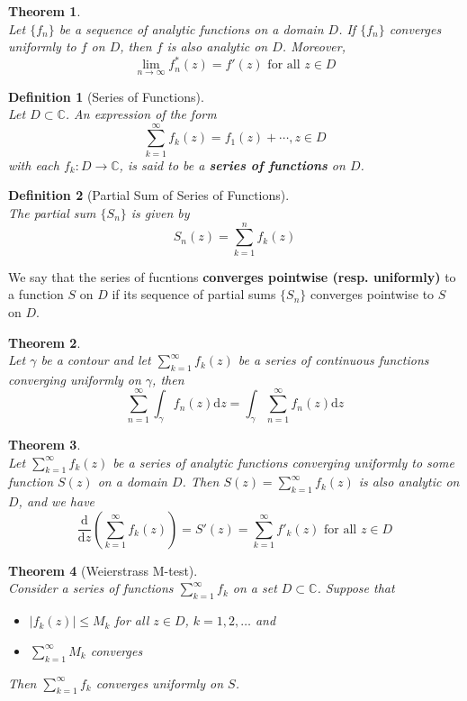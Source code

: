 \documentclass[12pt]{article}
\newcommand{\diff}{\mathrm{d}}
\newtheorem{definition}{Definition}[section]
\newtheorem{theorem}{Theorem}[section]
\theoremstyle{definition}
\begin{document}
\begin{theorem}\hfill\\\normalfont Let $\{f_n\}$ be a sequence of analytic functions on a domain $D$. If $\{f_n\}$ converges uniformly to $f$ on $D$, then $f$ is also analytic on $D$. Moreover,
\[
\lim_{n\to\infty}f_n^\ast(z)=f'(z)\text{ for all }z\in D
\]
\end{theorem}
\begin{definition}[Series of Functions]
\hfill\\\normalfont Let $D\subset \mathbb{C}$. An expression of the form 
\[
\sum_{k=1}^\infty f_k(z)=f_1(z)+\cdots, z\in D
\]
with each $f_k: D\to \mathbb{C}$, is said to be a \textbf{series of functions} on $D$.
\end{definition}
\begin{definition}[Partial Sum of Series of Functions]
\hfill\\\normalfont The partial sum $\{S_n\}$ is given by
\[
S_n(z)=\sum_{k=1}^n f_k(z)
\]
\end{definition}
We say that the series of fucntions \textbf{converges pointwise (resp. uniformly)} to a function $S$ on $D$ if its sequence of partial sums $\{S_n\}$ converges pointwise to $S$ on $D$.
\begin{theorem}\hfill\\\normalfont Let $\gamma$ be a contour and let $\sum_{k=1}^\infty f_k(z)$ be a series of continuous functions converging uniformly on $\gamma$, then
\[
\sum_{n=1}^\infty \int_\gamma f_n(z)\diff z = \int_\gamma \sum_{n=1}^\infty f_n(z)\diff z
\]
\end{theorem}
\begin{theorem}\hfill\\\normalfont Let $\sum_{k=1}^\infty f_k(z)$ be a series of analytic functions converging uniformly to some function $S(z)$ on a domain $D$. Then $S(z)=\sum_{k=1}^\infty f_k(z)$ is also analytic on $D$, and we have
\[
\frac{\diff }{\diff z}(\sum_{k=1}^\infty f_k(z))=S'(z)=\sum_{k=1}^\infty f'_k(z)\text{ for all }z\in D
\]
\end{theorem}
\begin{theorem}[Weierstrass M-test]
\hfill\\\normalfont Consider a series of functions $\sum_{k=1}^\infty f_k$ on a set $D\subset \mathbb{C}$. Suppose that
\begin{itemize}
	\item $|f_k(z)|\leq M_k$ for all $z\in D$, $k=1,2,\ldots $ and
	\item $\sum_{k=1}^\infty M_k$ converges
\end{itemize}
Then $\sum_{k=1}^\infty f_k$ converges uniformly on $S$.
\end{theorem}
\end{document}
